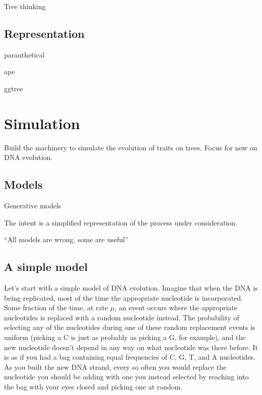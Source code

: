 \documentclass[
]{book}
\begin{document}
Tree thinking

\hypertarget{representation}{%
\section{Representation}\label{representation}}

paranthetical

ape

ggtree

\hypertarget{simulation}{%
\chapter{Simulation}\label{simulation}}

Build the machinery to simulate the evolution of traits on trees. Focus for now on DNA evolution.

\hypertarget{models}{%
\section{Models}\label{models}}

Generative models

The intent is a simplified representation of the process under consideration.

``All models are wrong, some are useful''

\hypertarget{a-simple-model}{%
\section{A simple model}\label{a-simple-model}}

Let's start with a simple model of DNA evolution. Imagine that when the DNA is being replicated, most of the time the appropriate nucleotide is incorporated. Some fraction of the time, at rate \(\mu\), an event occurs where the appropriate nucleotides is replaced with a random nucleotide instead. The probability of selecting any of the nucleotides during one of these random replacement events is uniform (picking a C is just as probably as picking a G, for example), and the new nucleotide doesn't depend in any way on what nucleotide was there before. It is as if you had a bag containing equal frequencies of C, G, T, and A nucleotides. As you built the new DNA strand, every so often you would replace the nucleotide you should be adding with one you instead selected by reaching into the bag with your eyes closed and picking one at random.
\end{document}
